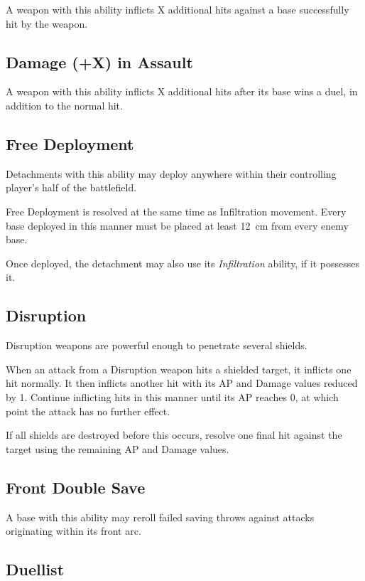 A weapon with this ability inflicts X additional hits against a base successfully hit by the weapon.

\subsection{Damage (+X) in Assault}

A weapon with this ability inflicts X additional hits after its base wins a duel, in addition to the normal hit.

\subsection{Free Deployment}

Detachments with this ability may deploy anywhere within their controlling player's half of the battlefield.

Free Deployment is resolved at the same time as Infiltration movement. Every base deployed in this manner must be placed at least 12~cm from every enemy base.

Once deployed, the detachment may also use its \textit{Infiltration} ability, if it possesses it.

\subsection{Disruption}

Disruption weapons are powerful enough to penetrate several shields.

When an attack from a Disruption weapon hits a shielded target, it inflicts one hit normally. It then inflicts another hit with its AP and Damage values reduced by 1. Continue inflicting hits in this manner until its AP reaches 0, at which point the attack has no further effect.

If all shields are destroyed before this occurs, resolve one final hit against the target using the remaining AP and Damage values.

\subsection{Front Double Save}

A base with this ability may reroll failed saving throws against attacks originating within its front arc.

\subsection{Duellist}


